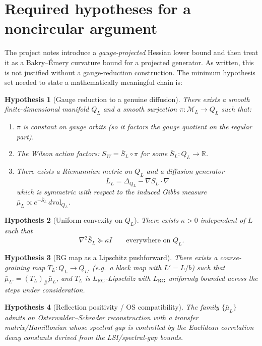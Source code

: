 \documentclass[11pt]{article}
\newtheorem{hypothesis}{Hypothesis}
\begin{document}
\section{Required hypotheses for a noncircular argument}

The project notes introduce a \emph{gauge-projected} Hessian lower bound and then treat it as a Bakry--\'Emery curvature bound for a projected generator.
As written, this is not justified without a gauge-reduction construction.
The minimum hypothesis set needed to state a mathematically meaningful chain is:

\begin{hypothesis}[Gauge reduction to a genuine diffusion]\label{H:gauge}
There exists a smooth finite-dimensional manifold $Q_L$ and a smooth surjection $\pi:\mathcal M_L\to Q_L$ such that:
\begin{enumerate}[leftmargin=*]
\item $\pi$ is constant on gauge orbits (so it factors the gauge quotient on the regular part).
\item The Wilson action factors: $S_W = \bar S_L\circ \pi$ for some $\bar S_L:Q_L\to\mathbb R$.
\item There exists a Riemannian metric on $Q_L$ and a diffusion generator
\[
\bar L_L = \Delta_{Q_L} - \nabla \bar S_L\cdot \nabla
\]
which is symmetric with respect to the induced Gibbs measure $\bar\mu_L\propto e^{-\bar S_L}\,d\mathrm{vol}_{Q_L}$.
\end{enumerate}
\end{hypothesis}

\begin{hypothesis}[Uniform convexity on $Q_L$]\label{H:convex}
There exists $\kappa>0$ independent of $L$ such that
\[
\nabla^2 \bar S_L \succeq \kappa I \qquad \text{everywhere on } Q_L.
\]
\end{hypothesis}

\begin{hypothesis}[RG map as a Lipschitz pushforward]\label{H:rg}
There exists a coarse-graining map $T_L:Q_L\to Q_{L'}$ (e.g.\ a block map with $L'=L/b$) such that $\bar\mu_{L'} = (T_L)_\#\bar\mu_L$, and $T_L$ is $L_{\mathrm{RG}}$-Lipschitz with $L_{\mathrm{RG}}$ uniformly bounded across the steps under consideration.
\end{hypothesis}

\begin{hypothesis}[Reflection positivity / OS compatibility]\label{H:os}
The family $\{\bar\mu_L\}$ admits an Osterwalder--Schrader reconstruction with a transfer matrix/Hamiltonian whose spectral gap is controlled by the Euclidean correlation decay constants derived from the LSI/spectral-gap bounds.
\end{hypothesis}
\end{document}
